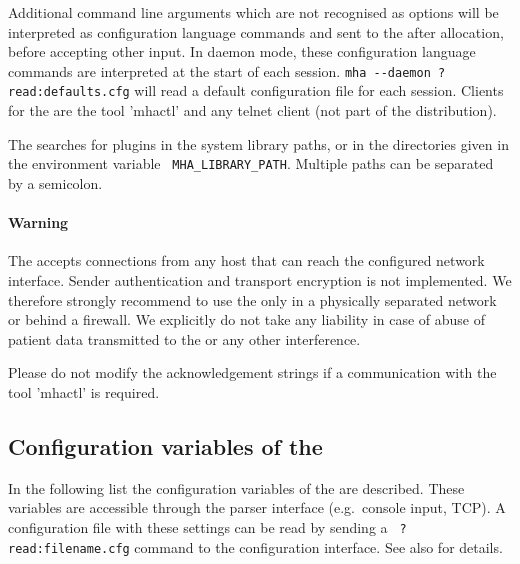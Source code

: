 Additional command line arguments which are not recognised as options
will be interpreted as \mha{} configuration language commands and sent to the
\mhad{} after allocation, before accepting other input.
%
In daemon mode, these \mha{} configuration language commands are interpreted at the 
start of each session.
\verb!mha --daemon ?read:defaults.cfg! will read a default
configuration file for each session.
%
Clients for the \mhad{} are the \Matlab{} tool 'mhactl' and any
telnet client (not part of the distribution).

The \mhad{} searches for \mha{} plugins in the system library paths, or in
the directories given in the environment variable {\tt
MHA\_LIBRARY\_PATH}.
%
Multiple paths can be separated by a semicolon.

\paragraph{Warning}

The \mhad{} accepts connections from any host that can reach
the configured network interface.
%
Sender authentication and transport encryption is not implemented.
%
We therefore strongly recommend to use the \mhad{} only in a
physically separated network or behind a firewall.
%
We explicitly do not take any liability in case of abuse of patient
data transmitted to the \mhad{} or any other interference.

Please do not modify the acknowledgement strings if a communication
with the \Matlab{} tool 'mhactl' is required.

\subsection{Configuration variables of the \mhad{}}

In the following list the configuration variables of the \mhad{} are
described. These variables are accessible through the parser interface
(e.g.\ console input, TCP).
%
A configuration file with these settings can be read by sending a {\tt
?read:filename.cfg} command to the configuration interface. See also
 for details.

